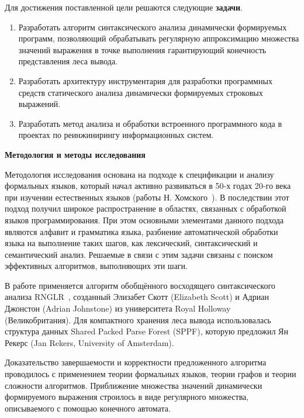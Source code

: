 Для достижения поставленной цели решаются следующие \textbf{задачи}.
\begin{enumerate}
    \item Разработать алгоритм синтаксического анализа динамически формируемых программ, позволяющий обрабатывать регулярную аппроксимацию множества значений выражения в точке выполнения гарантирующий конечность представления леса вывода.
    \item Разработать архитектуру инструментария для разработки программных средств статического анализа динамически формируемых строковых выражений.
    \item Разработать метод анализа и обработки встроенного программного кода в проектах по реинжинирингу информационных систем.
\end{enumerate}

\textbf{Методология и методы исследования}

Методология исследования основана на подходе к спецификации и анализу формальных языков, который начал активно развиваться в 50-х годах 20-го века при изучении естественных языков (работы Н. Хомского~\cite{chomskyMethod ,chomskySyntactic}). В последствии этот подход получил широкое распространение в областях, связанных с обработкой языков программирования.
При этом основными элементами данного подхода являются алфавит и грамматика языка, разбиение автоматической обработки языка на выполнение таких шагов, как лексический, синтаксический и семантический анализ. Решаемые в связи с этим задачи связаны с поиском эффективных алгоритмов, выполняющих эти шаги. 

В работе применяется алгоритм обобщённого восходящего синтаксического анализа RNGLR~\cite{RNGLR}, созданный Элизабет Скотт (Elizabeth Scott) и Адриан Джонстон (Adrian Johnstone) из университета Royal Holloway (Великобритания). Для компактного хранения леса вывода использовалась структура данных Shared Packed Parse Forest (SPPF), которую предложил Ян Рекерс (Jan Rekers, University of Amsterdam).

Доказательство завершаемости и корректности предложенного алгоритма проводилось с применением теории формальных языков, теории графов и теории сложности алгоритмов. Приближение множества значений динамически формируемого выражения строилось в виде регулярного множества, описываемого с помощью конечного автомата.


